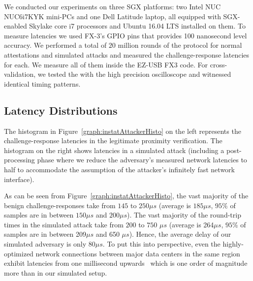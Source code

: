 We conducted our experiments on three SGX platforms: two Intel NUC NUC6i7KYK mini-PCs and one Dell Latitude laptop, all equipped with SGX-enabled Skylake core i7 processors and Ubuntu 16.04 LTS installed on them. To measure latencies we used FX-3's GPIO pins that provides 100 nanosecond level accuracy. We performed a total of $20$ million rounds of the protocol for normal attestations and simulated attacks and measured the challenge-response latencies for each. We measure all of them inside the EZ-USB FX3 code. For cross-validation, we tested the \device with the high precision oscilloscope and witnessed identical timing patterns.


\subsection{Latency Distributions}
\label{sec:evaluation:results}



The histogram in Figure~\ref{graph:instatAttackerHisto} on the left represents the challenge-response latencies in the legitimate proximity verification. The histogram on the right shows latencies in a simulated attack (including a post-processing phase where we reduce the adversary's measured network latencies to half to accommodate the assumption of the attacker's infinitely fast network interface).

As can be seen from Figure~\ref{graph:instatAttackerHisto}, the vast majority of the benign challenge-responses take from $145$ to $250 \mu s$ (average is $185 \mu s$, $95\%$ of samples are in between $150\mu s$ and  $200\mu s$). The vast majority of the round-trip times in the simulated attack take from $200$ to $750$ $\mu s$ (average is 264$\mu s$, $95\%$ of samples are in between 209$\mu s$ and 650 $\mu s$). Hence, the average delay of our simulated adversary is only $80 \mu s$. To put this into perspective, even the highly-optimized network connections between major data centers in the same region exhibit latencies from one millisecond upwards~\cite{agarwal_agarwal_2018} which is one order of magnitude more than in our simulated setup.



